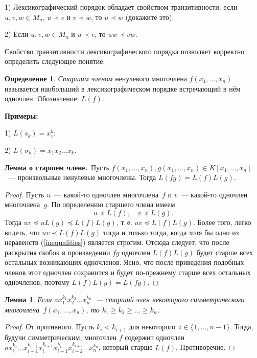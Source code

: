 \documentclass[a4paper,10pt]{amsart}
\newtheorem{lemma}{Лемма}
\theoremstyle{definition}
\newtheorem{definition}{Определение}
\theoremstyle{remark}
\begin{document}
1) Лексикографический порядок обладает свойством
транзитивности: если $u,v,w \in M_n$, $u \prec v$ и $v \prec w$, то
$u \prec w$ (докажите это).

2) Если $u,v,w \in M_n$ и $u \prec v$, то $uw \prec vw$.

Свойство транзитивности лексикографического порядка позволяет
корректно определить следующее понятие.

\begin{definition}
{\it Старшим членом} ненулевого многочлена $f(x_1,\ldots,x_n)$
называется наибольший в лексикографическом порядке встречающий в нём
одночлен. Обозначение: $L(f)$.
\end{definition}

\textbf{Примеры:}

1) $L(s_k) = x_1^k$;

2) $L(\sigma_k) = x_1x_2 \ldots x_k$.


{\bf Лемма о старшем члене.}\, Пусть $f(x_1, \ldots, x_n), g(x_1,
\ldots, x_n) \in K[x_1, \ldots, x_n]$~--- произвольные ненулевые
многочлены. Тогда $L(f g ) = L(f) L(g)$.

\begin{proof}
Пусть $u$~--- какой-то одночлен многочлена~$f$ и $v$~--- какой-то
одночлен многочлена~$g$. По определению старшего члена имеем
\begin{equation} \label{inequalities}
u \preccurlyeq L(f), \quad v \preccurlyeq L(g).
\end{equation}
Тогда $uv \preccurlyeq uL(g) \preccurlyeq L(f)L(g)$, т.\,е. $uv
\preccurlyeq L(f) L(g)$. Более того, легко видеть, что $uv \prec
L(f) L(g)$ тогда и только тогда, когда хотя бы одно из
\guillemotleft неравенств\guillemotright{} (\ref{inequalities})
является строгим. Отсюда следует, что после раскрытия скобок в
произведении $fg$ одночлен $L(f)L(g)$ будет старше всех остальных
возникающих одночленов. Ясно, что после приведения подобных членов
этот одночлен сохранится и будет по-прежнему старше всех остальных
одночленов, поэтому $L(f)L(g) = L(fg)$.
\end{proof}

\begin{lemma} \label{lemma_1}
Если $ax_1^{k_1}x_2^{k_2}\ldots x_n^{k_n}$~--- старший член
некоторого симметрического многочлена~$f(x_1, \ldots, x_n)$, то $k_1
\geqslant k_2 \geqslant \ldots \geqslant k_n$.
\end{lemma}

\begin{proof}
От противного. Пусть $k_i < k_{i+1}$ для некоторого~$i \in \lbrace
1, \ldots, n-1 \rbrace$. Тогда, будучи симметрическим, многочлен $f$
содержит одночлен $ax_1^{k_1} \ldots
x_{i-1}^{k_{i-1}}x_i^{k_{i+1}}x_{i+1}^{k_i}x_{i+2}^{k_{i+2}} \ldots
x_n^{k_n}$, который старше $L(f)$. Противоречие.
\end{proof}
\end{document}
